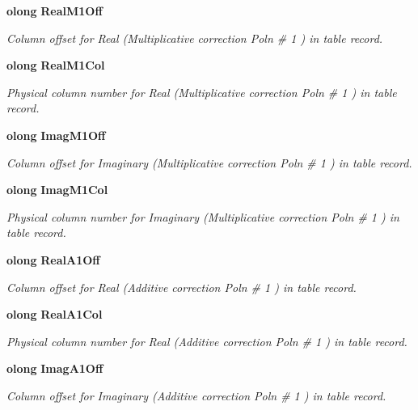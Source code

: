 \begin{CompactItemize}
{\bf olong} {\bf Real\-M1Off}
\begin{CompactList}\small\item\em Column offset for Real (Multiplicative correction Poln \# 1 ) in table record. \item\end{CompactList}\item 
{\bf olong} {\bf Real\-M1Col}
\begin{CompactList}\small\item\em Physical column number for Real (Multiplicative correction Poln \# 1 ) in table record. \item\end{CompactList}\item 
{\bf olong} {\bf Imag\-M1Off}
\begin{CompactList}\small\item\em Column offset for Imaginary (Multiplicative correction Poln \# 1 ) in table record. \item\end{CompactList}\item 
{\bf olong} {\bf Imag\-M1Col}
\begin{CompactList}\small\item\em Physical column number for Imaginary (Multiplicative correction Poln \# 1 ) in table record. \item\end{CompactList}\item 
{\bf olong} {\bf Real\-A1Off}
\begin{CompactList}\small\item\em Column offset for Real (Additive correction Poln \# 1 ) in table record. \item\end{CompactList}\item 
{\bf olong} {\bf Real\-A1Col}
\begin{CompactList}\small\item\em Physical column number for Real (Additive correction Poln \# 1 ) in table record. \item\end{CompactList}\item 
{\bf olong} {\bf Imag\-A1Off}
\begin{CompactList}\small\item\em Column offset for Imaginary (Additive correction Poln \# 1 ) in table record. \item\end{CompactList}\item 

\end{CompactItemize}
